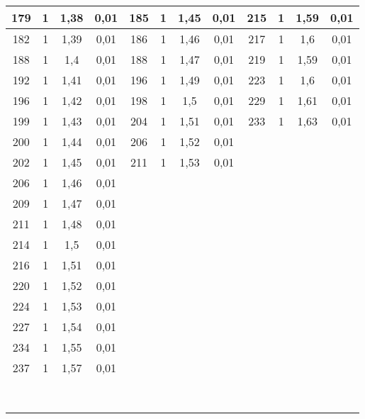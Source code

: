 \begin{tabular}{|*{12}{c|}}
 179 & 1 & 1,38 & 0,01 & 185 & 1 & 1,45 & 0,01 & 215 & 1 & 1,59 & 0,01 \\ \hline 
 182 & 1 & 1,39 & 0,01 & 186 & 1 & 1,46 & 0,01 & 217 & 1 & 1,6 & 0,01 \\ \hline 
 188 & 1 & 1,4 & 0,01 & 188 & 1 & 1,47 & 0,01 & 219 & 1 & 1,59 & 0,01 \\ \hline 
 192 & 1 & 1,41 & 0,01 & 196 & 1 & 1,49 & 0,01 & 223 & 1 & 1,6 & 0,01 \\ \hline 
 196 & 1 & 1,42 & 0,01 & 198 & 1 & 1,5 & 0,01 & 229 & 1 & 1,61 & 0,01 \\ \hline 
 199 & 1 & 1,43 & 0,01 & 204 & 1 & 1,51 & 0,01 & 233 & 1 & 1,63 & 0,01 \\ \hline 
 200 & 1 & 1,44 & 0,01 & 206 & 1 & 1,52 & 0,01 &  &  &  &  \\ \hline 
 202 & 1 & 1,45 & 0,01 & 211 & 1 & 1,53 & 0,01 &  &  &  &  \\ \hline 
 206 & 1 & 1,46 & 0,01 &  &  &  &  &  &  &  &  \\ \hline 
 209 & 1 & 1,47 & 0,01 &  &  &  &  &  &  &  &  \\ \hline 
 211 & 1 & 1,48 & 0,01 &  &  &  &  &  &  &  &  \\ \hline 
 214 & 1 & 1,5 & 0,01 &  &  &  &  &  &  &  &  \\ \hline 
 216 & 1 & 1,51 & 0,01 &  &  &  &  &  &  &  &  \\ \hline 
 220 & 1 & 1,52 & 0,01 &  &  &  &  &  &  &  &  \\ \hline 
 224 & 1 & 1,53 & 0,01 &  &  &  &  &  &  &  &  \\ \hline 
 227 & 1 & 1,54 & 0,01 &  &  &  &  &  &  &  &  \\ \hline 
 234 & 1 & 1,55 & 0,01 &  &  &  &  &  &  &  &  \\ \hline 
 237 & 1 & 1,57 & 0,01 &  &  &  &  &  &  &  &  \\ \hline 
  &  &  &  &  &  &  &  &  &  &  &  \\ \hline 
  &  &  &  &  &  &  &  &  &  &  &  \\ \hline 
  &  &  &  &  &  &  &  &  &  &  &  \\ \hline 
  &  &  &  &  &  &  &  &  &  &  &  \\ \hline 
  &  &  &  &  &  &  &  &  &  &  &  \\ \hline 
  &  &  &  &  &  &  &  &  &  &  &  \\ \hline 
  &  &  &  &  &  &  &  &  &  &  &  \\ \hline 
  &  &  &  &  &  &  &  &  &  &  &  \\ \hline 

\end{tabular}
